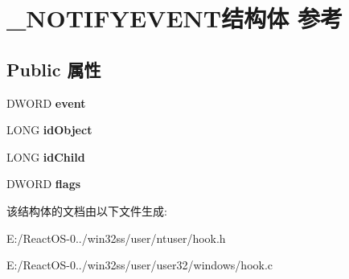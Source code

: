 \hypertarget{struct___n_o_t_i_f_y_e_v_e_n_t}{}\section{\+\_\+\+N\+O\+T\+I\+F\+Y\+E\+V\+E\+N\+T结构体 参考}
\label{struct___n_o_t_i_f_y_e_v_e_n_t}
\subsection*{Public 属性}
\begin{DoxyCompactItemize}
\item 
\mbox{\label{struct___n_o_t_i_f_y_e_v_e_n_t_af0a9517a83a3cb65c32e318be72373e9}} 
D\+W\+O\+RD {\bfseries event}
\item 
\mbox{\label{struct___n_o_t_i_f_y_e_v_e_n_t_ae50ee6192cdd781a09b5b8a4137ade54}} 
L\+O\+NG {\bfseries id\+Object}
\item 
\mbox{\label{struct___n_o_t_i_f_y_e_v_e_n_t_a64e22ec88fa801ca8717df077af59df6}} 
L\+O\+NG {\bfseries id\+Child}
\item 
\mbox{\label{struct___n_o_t_i_f_y_e_v_e_n_t_a6e9d25029692f017caf949e24a36d9f9}} 
D\+W\+O\+RD {\bfseries flags}
\end{DoxyCompactItemize}


该结构体的文档由以下文件生成\+:\begin{DoxyCompactItemize}
\item 
E\+:/\+React\+O\+S-\/0../win32ss/user/ntuser/hook.\+h\item 
E\+:/\+React\+O\+S-\/0../win32ss/user/user32/windows/hook.\+c\end{DoxyCompactItemize}
